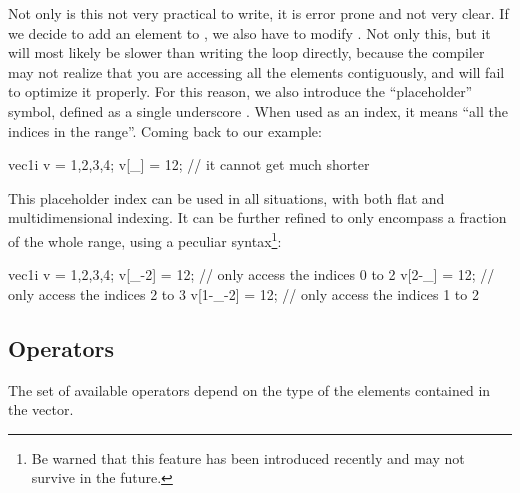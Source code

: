\documentclass[12pt]{report}
\begin{document}
Not only is this not very practical to write, it is error prone and not very clear. If we decide to add an element to , we also have to modify . Not only this, but it will most likely be slower than writing the loop directly, because the compiler may not realize that you are accessing all the elements contiguously, and will fail to optimize it properly. For this reason, we also introduce the ``placeholder'' symbol, defined as a single underscore \cppinline{_}. When used as an index, it means ``all the indices in the range''. Coming back to our example:

\begin{cppcode}
vec1i v = {1,2,3,4};
v[_] = 12; // it cannot get much shorter
\end{cppcode}

This placeholder index can be used in all situations, with both flat and multidimensional indexing. It can be further refined to only encompass a fraction of the whole range, using a peculiar syntax\footnote{Be warned that this feature has been introduced recently and may not survive in the future.}:

\begin{cppcode}
vec1i v = {1,2,3,4};
v[_-2] = 12;   // only access the indices 0 to 2
v[2-_] = 12;   // only access the indices 2 to 3
v[1-_-2] = 12; // only access the indices 1 to 2

\end{cppcode}

\subsection{Operators \label{SEC:core:vec:operator}}

The set of available operators depend on the type of the elements contained in the vector.

\end{document}
